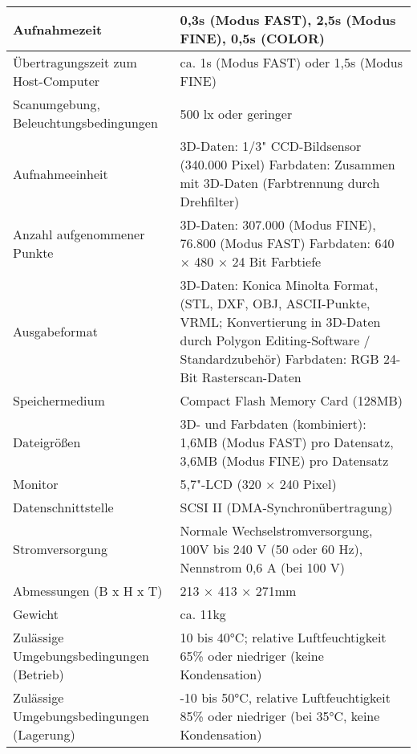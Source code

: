 \begin{longtable}{|m{4cm}|m{9cm}|}
Aufnahmezeit & 0,3s (Modus FAST), 2,5s (Modus FINE), 0,5s (COLOR)
 \\ \hline 
Übertragungszeit zum Host-Computer	 & ca. 1s (Modus FAST) oder 1,5s (Modus FINE)
 \\ \hline 
Scanumgebung, Beleuchtungsbedingungen	 & 500 lx oder geringer
 \\ \hline 
Aufnahmeeinheit & 3D-Daten: 1/3" CCD-Bildsensor (340.000 Pixel) 
Farbdaten: Zusammen mit 3D-Daten (Farbtrennung durch Drehfilter)
 \\ \hline 
Anzahl aufgenommener Punkte	 & 3D-Daten: 307.000 (Modus FINE), 76.800 (Modus FAST) 
Farbdaten: 640 × 480 × 24 Bit Farbtiefe
 \\ \hline 
Ausgabeformat & 3D-Daten: Konica Minolta Format, (STL, DXF, OBJ, ASCII-Punkte, VRML; Konvertierung in 3D-Daten durch Polygon Editing-Software / Standardzubehör)
Farbdaten: RGB 24-Bit Rasterscan-Daten
 \\ \hline 
Speichermedium & Compact Flash Memory Card (128MB)
 \\ \hline 
Dateigrößen & 3D- und Farbdaten (kombiniert): 1,6MB (Modus FAST) pro Datensatz, 3,6MB (Modus FINE) pro Datensatz 
 \\ \hline 
Monitor & 5,7"-LCD (320 × 240 Pixel)
 \\ \hline 
Datenschnittstelle & SCSI II (DMA-Synchronübertragung)
 \\ \hline 
Stromversorgung & Normale Wechselstromversorgung, 100V bis 240 V (50 oder 60 Hz), Nennstrom 0,6 A (bei 100 V) \\ \hline 
Abmessungen (B x H x T)	 & 213 × 413 × 271mm 
 \\ \hline 
Gewicht & ca. 11kg
 \\ \hline 
Zulässige Umgebungsbedingungen (Betrieb) & 10 bis 40°C; relative Luftfeuchtigkeit 65\% oder niedriger (keine Kondensation)
 \\ \hline 
Zulässige Umgebungsbedingungen (Lagerung) & -10 bis 50°C, relative Luftfeuchtigkeit 85\% oder niedriger (bei 35°C, keine Kondensation) 
 \\ \hline 
 
\end{longtable} 